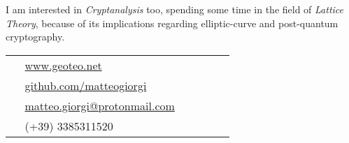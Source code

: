 \documentclass[10pt]{article} %
\begin{document}
\begin{paracol}{2}
\medskip
I am interested in \textit{Cryptanalysis} too, spending some time in the field of \textit{Lattice Theory}, because of its implications regarding elliptic-curve and post-quantum cryptography.






\switchcolumn %


\parbox[top][0.12\textheight][c]{\linewidth}{ %
	\vspace{-0.04\textheight} %
	\colorbox{shade}{ %
		\begin{supertabular}{p{0.05\linewidth}|p{0.775\linewidth}} %
			\raisebox{-1pt}{\faGlobe} & \href{https://www.geoteo.net}{www.geoteo.net} \\ %
            \raisebox{-1pt}{\faGithub} & \href{https://github.com/matteogiorgi}{github.com/matteogiorgi} \\ %
			\raisebox{-1pt}{\faEnvelopeSquare} & \href{mailto:matteo.giorgi@protonmail.com}{matteo.giorgi@protonmail.com} \\ %
			\raisebox{-1pt}{\faPhoneSquare} & (+39) 3385311520 \\ %
		\end{supertabular}
	}
}


\end{paracol}
\end{document}
